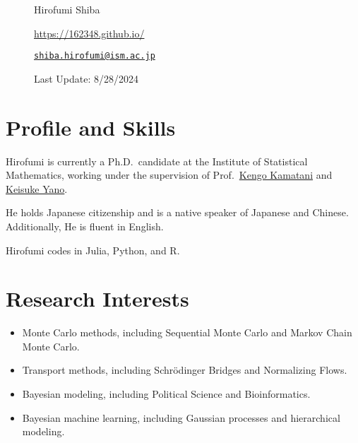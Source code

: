 \documentclass[
  11pt,
]{article}
\date{}
\begin{document}
\begin{figure}

\begin{minipage}{0.50\linewidth}
\Huge Hirofumi Shiba\end{minipage}%
%
\begin{minipage}{0.50\linewidth}

\color{minty}

\hfill {} \url{https://162348.github.io/}

\par

\hfill {}
\href{mailto:shiba.hirofumi@ism.ac.jp}{\nolinkurl{shiba.hirofumi@ism.ac.jp}}

\par

\color{gray}\hfill {Last Update: 8/28/2024}\end{minipage}%

\end{figure}%

\vspace{-1em}

\section{Profile and Skills}\label{profile-and-skills}

Hirofumi is currently a Ph.D.~candidate at the Institute of Statistical
Mathematics, working under the supervision of
Prof.~\href{https://sites.google.com/view/kengokamatani/home}{Kengo
Kamatani} and \href{https://sites.google.com/site/kyanostat/}{Keisuke
Yano}.

He holds Japanese citizenship and is a native speaker of Japanese and
Chinese. Additionally, He is fluent in English.

Hirofumi codes in Julia, Python, and R.

\section{Research Interests}\label{research-interests}

\begin{itemize}
\item
  Monte Carlo methods, including Sequential Monte Carlo and Markov Chain
  Monte Carlo.
\item
  Transport methods, including Schrödinger Bridges and Normalizing
  Flows.
\item
  Bayesian modeling, including Political Science and Bioinformatics.
\item
  Bayesian machine learning, including Gaussian processes and
  hierarchical modeling.
\end{itemize}
\end{document}
